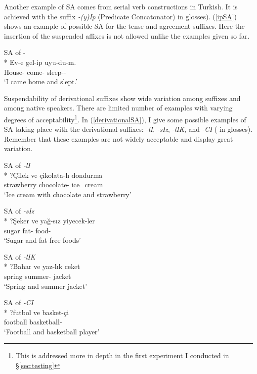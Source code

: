 Another example of SA comes from serial verb constructions in Turkish. It is achieved with the suffix \textit{-(y)Ip} (Predicate Concatonator) {\Pc} in glosses). (\ref{ipSA}) shows an example of possible SA for the tense and agreement suffixes. Here the insertion of the suspended affixes is not allowed unlike the examples given so far.

\begin{exe}
    \ex \label{ipSA} SA of {\Pst-\Fsg}\\*
    \gll Ev-e gel-ip uyu-du-m. \\ 
    House-{\Dat} come-{\Pc} sleep-{{\Pst}}-{\Fsg} \\
    \glt `I came home and slept.'
\end{exe}

Suspendability of derivational suffixes show wide variation among suffixes and among native speakers. There are limited number of examples with varying degrees of acceptability\footnote{This is addressed more in depth in the first experiment I conducted in \S\ref{sec:testing}}. In (\ref{derivationalSA}), I give some possible examples of SA taking place with the derivational suffixes: \textit{-lI}, \textit{-sIz}, \textit{-lIK}, and \textit{-CI} ({\Der} in glosses). Remember that these examples are not widely acceptable and display great variation.

\begin{exe}
    \ex \label{derivationalSA}
    \begin{xlist}
        \ex SA of \textit{-lI}\\*
        \gll ?Çilek ve çikolata-lı dondurma \\ 
        strawberry {\And} chocolate-{\Der} ice\_cream \\
        \glt `Ice cream with chocolate and strawberry'
        
        \ex SA of \textit{-sIz}\\*
        \gll ?Şeker ve yağ-sız yiyecek-ler \\ 
        sugar {\And} fat-{\Der} food-{\Pl} \\
        \glt `Sugar and fat free foods'
        
        \ex SA of \textit{-lIK}\\*
        \gll ?Bahar ve yaz-lık ceket \\ 
        spring {\And} summer-{\Der} jacket \\
        \glt `Spring and summer jacket'
        
        \ex SA of \textit{-CI}\\*
        \gll ?futbol ve basket-çi \\ 
        football {\And} basketball-{\Der} \\ 
        \glt `Football and basketball player'
    \end{xlist}
\end{exe}
